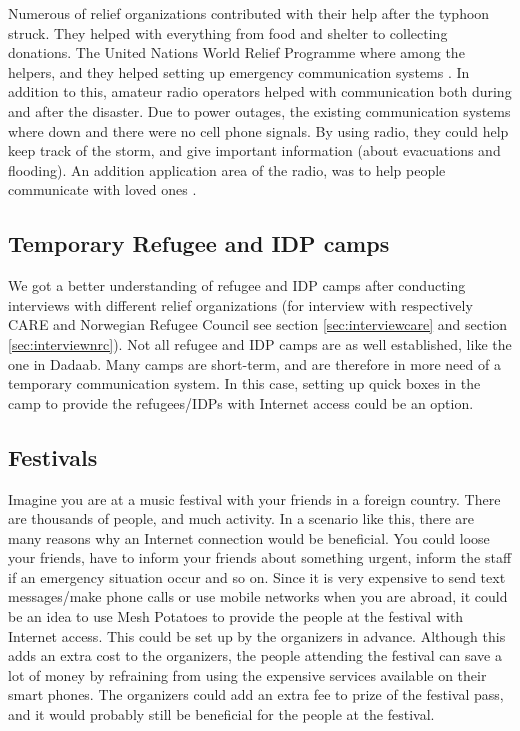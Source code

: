 Numerous of relief organizations contributed with their help after the typhoon struck. They helped with everything from food and shelter to collecting donations. The United Nations World Relief Programme where among the helpers, and they helped setting up emergency communication systems \cite{philippines}. In addition to this, amateur radio operators helped with communication both during and after the disaster. Due to power outages, the existing communication systems where down and there were no cell phone signals. By using radio, they could help keep track of the storm, and give important information (about evacuations and flooding). An addition application area of the radio, was to help people communicate with loved ones \cite{philippinesradio}. 


\subsection{Temporary Refugee and IDP camps}
We got a better understanding of refugee and IDP camps after conducting interviews with different relief organizations (for interview with respectively CARE and Norwegian Refugee Council see section \ref{sec:interviewcare} and section \ref{sec:interviewnrc}). 
Not all refugee and IDP camps are as well established, like the one in Dadaab. Many camps are short-term, and are therefore in more need of a temporary communication system. In this case, setting up \gls{quick} boxes in the camp to provide the refugees/IDPs with Internet access could be an option. 

\subsection{Festivals}
Imagine you are at a music festival with your friends in a foreign country. There are thousands of people, and much activity. In a scenario like this, there are many reasons why an Internet connection would be beneficial. You could loose your friends, have to inform your friends about something urgent, inform the staff if an emergency situation occur and so on. Since it is very expensive to send text messages/make phone calls or use mobile networks when you are abroad, it could be an idea to use Mesh Potatoes to provide the people at the festival with Internet access. This could be set up by the organizers in advance. Although this adds an extra cost to the organizers, the people attending the festival can save a lot of money by refraining from using the expensive services available on their smart phones. The organizers could add an extra fee to prize of the festival pass, and it would probably still be beneficial for the people at the festival. 

